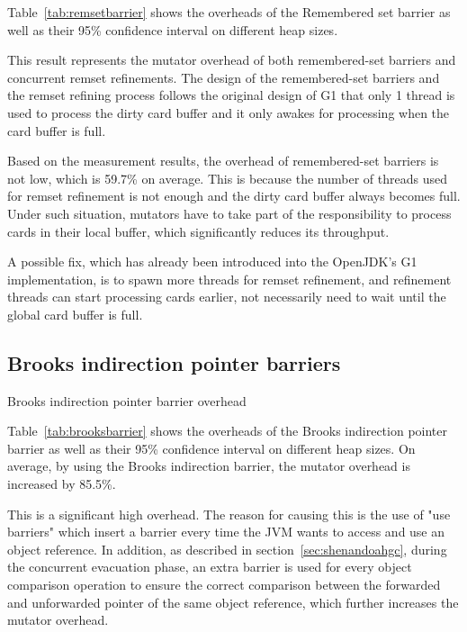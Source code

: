 Table~\ref{tab:remsetbarrier} shows the overheads of the Remembered set barrier
as well as their 95\% confidence interval on different heap sizes.

This result represents the mutator overhead of both remembered-set barriers and concurrent remset refinements.
The design of the remembered-set barriers and the remset refining process follows
the original design of G1 that only 1 thread is used to process the dirty card
buffer and it only awakes for processing when the card buffer is full.

Based on the measurement results, the overhead of remembered-set barriers is not low,
which is 59.7\% on average. This is because the number of threads used for remset refinement
is not enough and the dirty card buffer always becomes full. Under such situation,
mutators have to take part of the responsibility to process cards in their local buffer,
which significantly reduces its throughput.

A possible fix, which has already been introduced into the OpenJDK's G1 implementation, is
to spawn more threads for remset refinement, and refinement threads can start processing cards earlier,
not necessarily need to wait until the global card buffer is full.

\subsection{Brooks indirection pointer barriers}

\begin{table*}
  \centering
  
  \caption{Brooks indirection pointer barrier overhead}
  \label{tab:brooksbarrier}
\end{table*}

Table~\ref{tab:brooksbarrier} shows the overheads of the Brooks indirection pointer barrier
as well as their 95\% confidence interval on different heap sizes.
On average, by using the Brooks indirection barrier, the mutator overhead
is increased by 85.5\%.

This is a significant high overhead. The reason for causing this is the use of 
"use barriers" which insert a barrier every time the JVM wants to access and use
an object reference. In addition, as described in section~\ref{sec:shenandoahgc}, during the concurrent evacuation phase,
an extra barrier is used for every object comparison operation
to ensure the correct comparison between the forwarded and unforwarded pointer of the same object reference,
which further increases the mutator overhead.

